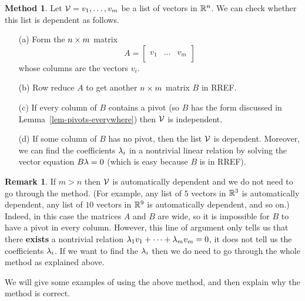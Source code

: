 \documentclass[reqno]{amsart}
\theoremstyle{definition}
\newtheorem{remark}[theorem]{Remark}
\newtheorem{method}[theorem]{Method}
\begin{document}
\begin{method}\label{meth-check-dependence}
 Let $\mathcal{V}=v_1,\dotsc,v_m$ be a list of vectors in ${\mathbb{R}}^n$.  We can
 check whether this list is dependent as follows.
 \begin{itemize}
  \item[(a)] Form the $n\times m$ matrix
   \[ A = \left[\begin{array}{c|c|c}
              && \\
              v_1 & \dotsc & v_m \\
              &&
            \end{array}\right]
   \]
   whose columns are the vectors $v_i$.
  \item[(b)] Row reduce $A$ to get another $n\times m$ matrix $B$ in
   RREF.
  \item[(c)] If every column of $B$ contains a pivot (so $B$ has the
   form discussed in Lemma~\ref{lem-pivots-everywhere}) then $\mathcal{V}$ is
   independent.
  \item[(d)] If some column of $B$ has no pivot, then the list $\mathcal{V}$
   is dependent.  Moreover, we can find the coefficients $\lambda_i$ in a
   nontrivial linear relation by solving the vector equation $B\lambda=0$
   (which is easy because $B$ is in RREF).
 \end{itemize}
\end{method}
\begin{remark}\label{rem-dependence-shortcut}
 If $m>n$ then $\mathcal{V}$ is automatically dependent and we do not need to
 go through the method.  (For example, any list of $5$ vectors in
 ${\mathbb{R}}^3$ is automatically dependent, any list of $10$ vectors in ${\mathbb{R}}^9$
 is automatically dependent, and so on.)  Indeed, in this case the
 matrices $A$ and $B$ are wide, so it is impossible for $B$ to have a
 pivot in every column.  However, this line of argument only tells us
 that there \textbf{exists} a nontrivial relation
 $\lambda_1v_1+\dotsb+\lambda_mv_m=0$, it does not tell us the coefficients
 $\lambda_i$.  If we want to find the $\lambda_i$ then we do need to go
 through the whole method as explained above.
\end{remark}

We will give some examples of using the above method, and then explain
why the method is correct.
\end{document}
